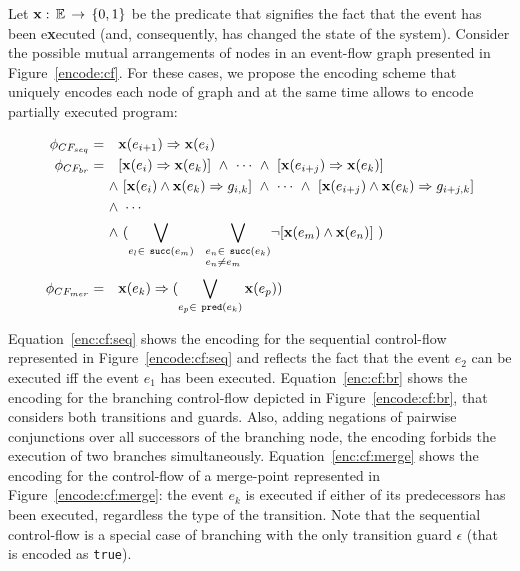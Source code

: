 Let $\mathbf{x}:\,\mathbb{E}\,\rightarrow\,\{0,1\}$ be the predicate that signifies the fact that the event has been e\textbf{x}ecuted (and, consequently, has changed the state of the system).
Consider the possible mutual arrangements of nodes in an event-flow graph presented in Figure~\ref{encode:cf}.
For these cases, we propose the encoding scheme that uniquely encodes each node of graph and at the same time allows to encode partially executed program:

\begin{align}
\phi_{CF_{seq}} \defeq \quad & \fx(e_{i+1}) \Rightarrow \fx(e_i) \label{enc:cf:seq} \\
\phi_{CF_{br}}  \defeq \quad & [\fx(e_i) \Rightarrow \fx(e_k)] \ \land \ \cdots \ \land \ [\fx(e_{i+j}) \Rightarrow \fx(e_k)] \nonumber \\
                       \land & \ [\fx(e_i) \land \fx(e_k) \Rightarrow g_{i,k}] \ \land \ \cdots \ \land \ [\fx(e_{i+j}) \land \fx(e_k) \Rightarrow g_{i+j,k}] \nonumber \\
                       \land & \ \cdots \nonumber \\
                       \land & \ ( \bigvee_{e_l \in \ \texttt{succ}(e_m)} \ \
                               \bigvee_{\begin{subarray}{l}e_n \in \ \texttt{succ}(e_k) \\ e_n \neq e_m\end{subarray}} 
                              \! \lnot [\fx(e_m) \land \fx(e_n)] \ ) \label{enc:cf:br} \\
\phi_{CF_{mer}} \defeq \quad & \fx(e_k) \Rightarrow (\bigvee\limits_{e_p \in \ \texttt{pred}(e_k)}^{} \fx(e_p)) \label{enc:cf:merge}
\end{align}

Equation~\ref{enc:cf:seq} shows the encoding for the sequential control-flow represented in Figure~\ref{encode:cf:seq} and reflects the fact that the event $e_2$ can be executed iff the event $e_1$ has been executed.
Equation~\ref{enc:cf:br} shows the encoding for the branching control-flow depicted in Figure~\ref{encode:cf:br}, that considers both transitions and guards.
Also, adding negations of pairwise conjunctions over all successors of the branching node, the encoding forbids the execution of two branches simultaneously.
Equation~\ref{enc:cf:merge} shows the encoding for the control-flow of a merge-point represented in Figure~\ref{encode:cf:merge}: the event $e_k$ is executed if either of its predecessors has been executed, regardless the type of the transition.
Note that the sequential control-flow is a special case of branching with the only transition guard $\epsilon$ (that is encoded as \texttt{true}).

